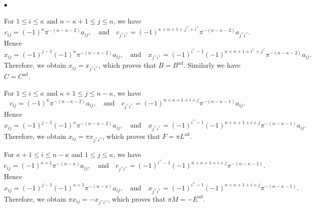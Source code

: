 \documentclass[pdflatex,sn-mathphys-num]{sn-jnl}%
\theoremstyle{thmstyleone}%
\theoremstyle{thmstyletwo}%
\numberwithin{equation}{subsection}
\theoremstyle{thmstylethree}%
\newcommand{\ad}{\mathrm{ad}}
\newenvironment{altitemize}
	{\begin{list}
			{$\bullet$}
			{\setlength{\labelwidth}{0pt}
				\setlength{\itemindent}{5pt}
				\setlength{\labelsep}{5pt}
				\setlength{\leftmargin}{0pt}
				\setlength{\itemsep}{\the\smallskipamount}
		}}
		{\end{list}}
\begin{document}
\begin{altitemize}
\item 
For $1\leq i\leq \kappa$ and $n-\kappa+1\leq j\leq n$, we have
\begin{equation*}
c_{ij}=(-1)^\kappa\pi^{-(n-\kappa-2)}a_{ij},
\quad\text{and}\quad
c_{j^\vee i^\vee}=(-1)^{\kappa+n+1+j^\vee+i^\vee}\pi^{-(n-\kappa-2)}a_{j^\vee i^\vee}.
\end{equation*}
Hence
\begin{equation*}
x_{ij}=(-1)^{j-1}(-1)^\kappa\pi^{-(n-\kappa-2)}a_{ij},
\quad\text{and}\quad
x_{j^\vee i^\vee}=(-1)^{i^\vee-1}(-1)^{\kappa+n+1+i^\vee+j^\vee}\pi^{-(n-\kappa-2)}a_{ij}.
\end{equation*}
Therefore, we obtain $x_{ij}=x_{j^\vee i^\vee}$, which proves that $B=B^{\ad}$.
Similarly we have $C=C^{\ad}$.
				
\item 
For $1\leq i\leq \kappa$ and $\kappa+1\leq j\leq n-\kappa$, we have
\begin{equation*}
c_{ij}=(-1)^\kappa\pi^{-(n-\kappa-2)}a_{ij},
\quad\text{and}\quad
c_{j^\vee i^\vee}=(-1)^{n+\kappa+1+i+j}\pi^{-(n-\kappa-1)}a_{ij}.
\end{equation*}
Hence
\begin{equation*}
x_{ij}=(-1)^{j-1}(-1)^\kappa\pi^{-(n-\kappa-2)}a_{ij},
\quad\text{and}\quad
x_{j^\vee i^\vee}=(-1)^{i^\vee-1}(-1)^{n+\kappa+1+i+j}\pi^{-(n-\kappa-1)}a_{ij}.
\end{equation*}
Therefore, we obtain $x_{ij}=\pi x_{j^\vee i^\vee}$, which proves that $F=\pi L^{\ad}$.
				
\item 
For $\kappa+1\leq i\leq n-\kappa$ and  $1\leq j\leq \kappa$, we have
\begin{equation*}
c_{ij}=(-1)^{\kappa+1}\pi^{-(n-\kappa)}a_{ij},
\quad\text{and}\quad
c_{j^\vee i^\vee}=(-1)^{i^\vee -1}(-1)^{n+\kappa+1+i+j}\pi^{-(n-\kappa-1)}.
\end{equation*}
Hence
\begin{equation*}
x_{ij}=(-1)^{j-1}(-1)^{\kappa+1}\pi^{-(n-\kappa)}a_{ij},
\quad\text{and}\quad
x_{j^\vee i^\vee}=(-1)^{i^\vee-1}(-1)^{n+\kappa+1+i+j}\pi^{-(n-\kappa-1)}.
\end{equation*}
Therefore, we obtain $\pi x_{ij}=-x_{j^\vee i^\vee}$, which proves that $\pi M=-E^{\ad}$.
				

\end{altitemize}
\end{document}
